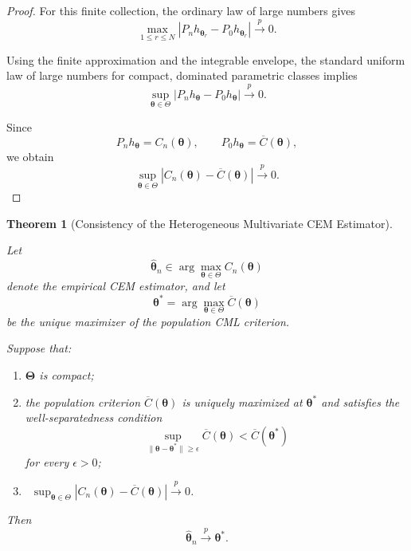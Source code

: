\documentclass[pdflatex,sn-mathphys-ay]{sn-jnl}%
\let\oldtheta\theta
\renewcommand{\theta}{\boldsymbol{\oldtheta}}
\theoremstyle{thmstyleone}%
\newtheorem{theorem}{Theorem}%
\theoremstyle{thmstyletwo}%
\theoremstyle{thmstylethree}%
\begin{document}
\begin{proof}
For this finite collection, the ordinary law of large numbers gives
\[
    \max_{1\leq r\leq N}
    \left|
        P_n h_{\boldsymbol{\theta}_r}
        -
        P_0 h_{\boldsymbol{\theta}_r}
    \right|
    \xrightarrow{p}
    0.
\]

Using the finite approximation and the integrable envelope, the standard uniform law of large numbers for compact, dominated parametric classes \citep{Newey1994} implies
\[
    \sup_{\boldsymbol{\theta}\in\Theta}
    |P_n h_{\boldsymbol{\theta}}
    -
    P_0 h_{\boldsymbol{\theta}}|
    \xrightarrow{p}
    0.
\]

Since
\[
    P_n h_{\boldsymbol{\theta}}
    =
    C_n(\boldsymbol{\theta}),
    \qquad
    P_0 h_{\boldsymbol{\theta}}
    =
    \overline{C}(\boldsymbol{\theta}),
\]
we obtain
\[
    \sup_{\boldsymbol{\theta}\in\Theta}
    \left|
        C_n(\boldsymbol{\theta})
        -
        \overline{C}(\boldsymbol{\theta})
    \right|
    \xrightarrow{p}
    0.
\]

\end{proof}

\begin{theorem}[Consistency of the Heterogeneous Multivariate CEM Estimator]
\label{thm:cem_consistency}

Let
\[
    \widehat{\boldsymbol{\theta}}_n
    \in
    \arg\max_{\boldsymbol{\theta}\in\Theta}
    C_n(\boldsymbol{\theta})
\]
denote the empirical CEM estimator, and let
\[
    \boldsymbol{\theta}^*
    =
    \arg\max_{\boldsymbol{\theta}\in\Theta}
    \overline{C}(\boldsymbol{\theta})
\]
be the unique maximizer of the population CML criterion.

Suppose that:

\begin{enumerate}

\item $\boldsymbol{\Theta}$ is compact;

\item
the population criterion $\overline{C}(\boldsymbol{\theta})$ is uniquely maximized at $ \boldsymbol{\theta}^*$ and satisfies the well-separatedness condition
\[
    \sup_{
        \|\boldsymbol{\theta}-\boldsymbol{\theta}^*\|
        \geq
        \epsilon
    }
    \overline{C}(\boldsymbol{\theta})
    <
    \overline{C}(\boldsymbol{\theta}^*)
\]
for every $\epsilon>0$;


\item
    ~$\sup_{\boldsymbol{\theta}\in\Theta}
    \left|
        C_n(\boldsymbol{\theta})
        -
        \overline{C}(\boldsymbol{\theta})
    \right|
    \xrightarrow{p}
    0$.

\end{enumerate}

Then
\[
    \widehat{\boldsymbol{\theta}}_n
    \xrightarrow{p}
    \boldsymbol{\theta}^*.
\]

\end{theorem}
\end{document}
